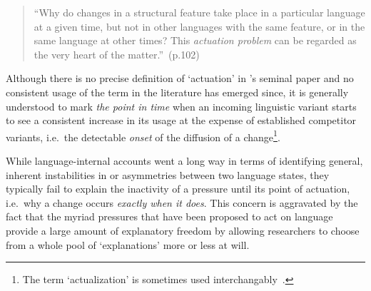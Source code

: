 \begin{quote}
``Why do changes in a structural feature take place in a particular language at a given time, but not in other languages with the same feature, or in the same language at other times? This \emph{actuation problem} can be regarded as the very heart of the matter.''~(p.102)
\end{quote}

Although there is no precise definition of `actuation' in \citeauthor{Weinreich1968}'s seminal paper and no consistent usage of the term in the literature has emerged since, it is generally understood to mark \emph{the point in time} when an incoming linguistic variant starts to see a consistent increase in its usage at the expense of established competitor variants, i.e.~the detectable \emph{onset} of the diffusion of a change\footnote{The term `actualization' \citep[with a specific meaning in grammaticalisation theory, see][p.24]{Traugott2011} is sometimes used interchangably~\citep{Andersen2008,Kiparsky2014}.}.


While language-internal accounts went a long way in terms of identifying general, inherent instabilities in or asymmetries between two language states, they typically fail to explain the inactivity of a pressure until its point of actuation, i.e.~why a change occurs \emph{exactly when it does}. %
This concern is aggravated by the fact that the myriad pressures that have been proposed to act on language provide a large amount of explanatory freedom by allowing researchers to choose from a whole pool of `explanations' more or less at will.

